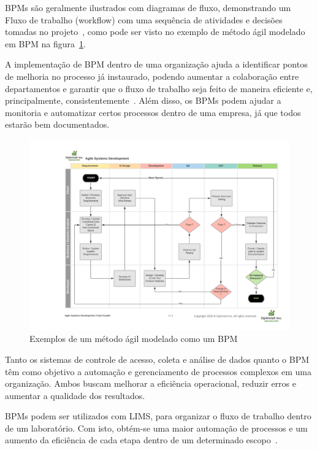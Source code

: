 
BPMs são geralmente ilustrados com diagramas de fluxo, demonstrando um Fluxo de trabalho (workflow) com uma sequência de atividades e decisões tomadas no projeto~\cite{Entringer2021ComparativeStudy}, como pode ser visto no exemplo de método ágil modelado em BPM na figura~\ref{fig:bpm}.

A implementação de BPM dentro de uma organização ajuda a identificar pontos de melhoria no processo já instaurado, podendo aumentar a colaboração entre departamentos e garantir que o fluxo de trabalho seja feito de maneira eficiente e, principalmente, consistentemente~\cite{DaSilva2014BusinessNot}.
Além disso, os BPMs podem ajudar a monitoria e automatizar certos processos dentro de uma empresa, já que todos estarão bem documentados.

\begin{figure}
    \centering
    \includegraphics[width=1\textwidth]{imgs/BPM/sprint as bpm.png}
    \caption{Exemplos de um método ágil modelado como um BPM}
    \label{fig:bpm}
\end{figure}


Tanto os sistemas de controle de acesso, coleta e análise de dados quanto o BPM têm como objetivo a automação e gerenciamento de processos complexos em uma organização. Ambos buscam melhorar a eficiência operacional, reduzir erros e aumentar a qualidade dos resultados.

BPMs podem ser utilizados com LIMS, para organizar o fluxo de trabalho dentro de um laboratório. Com isto, obtém-se uma maior automação de processos e um aumento da eficiência de cada etapa dentro de um determinado escopo~\cite{Key2011LIMS:Systems}.

